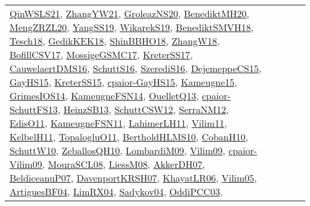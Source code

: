 {\begin{longtable}{llp{6cm}p{6cm}p{6cm}}
\href{articles/QinWSLS21.pdf}{QinWSLS21}\cite{QinWSLS21}, \href{articles/ZhangYW21.pdf}{ZhangYW21}\cite{ZhangYW21}, \href{papers/GroleazNS20.pdf}{GroleazNS20}\cite{GroleazNS20}, \href{articles/BenediktMH20.pdf}{BenediktMH20}\cite{BenediktMH20}, \href{articles/MengZRZL20.pdf}{MengZRZL20}\cite{MengZRZL20}, \href{papers/YangSS19.pdf}{YangSS19}\cite{YangSS19}, \href{articles/WikarekS19.pdf}{WikarekS19}\cite{WikarekS19}, \href{papers/BenediktSMVH18.pdf}{BenediktSMVH18}\cite{BenediktSMVH18}, \href{papers/Tesch18.pdf}{Tesch18}\cite{Tesch18}, \href{articles/GedikKEK18.pdf}{GedikKEK18}\cite{GedikKEK18}, \href{articles/ShinBBHO18.pdf}{ShinBBHO18}\cite{ShinBBHO18}, \href{articles/ZhangW18.pdf}{ZhangW18}\cite{ZhangW18}, \href{papers/BofillCSV17.pdf}{BofillCSV17}\cite{BofillCSV17}, \href{papers/MossigeGSMC17.pdf}{MossigeGSMC17}\cite{MossigeGSMC17}, \href{articles/KreterSS17.pdf}{KreterSS17}\cite{KreterSS17}, \href{papers/CauwelaertDMS16.pdf}{CauwelaertDMS16}\cite{CauwelaertDMS16}, \href{papers/SchuttS16.pdf}{SchuttS16}\cite{SchuttS16}, \href{papers/SzerediS16.pdf}{SzerediS16}\cite{SzerediS16}, \href{papers/DejemeppeCS15.pdf}{DejemeppeCS15}\cite{DejemeppeCS15}, \href{papers/GayHS15.pdf}{GayHS15}\cite{GayHS15}, \href{papers/KreterSS15.pdf}{KreterSS15}\cite{KreterSS15}, \href{papers/cpaior-GayHS15.pdf}{cpaior-GayHS15}\cite{cpaior-GayHS15}, \href{articles/Kameugne15.pdf}{Kameugne15}\cite{Kameugne15}, \href{articles/GrimesIOS14.pdf}{GrimesIOS14}\cite{GrimesIOS14}, \href{articles/KameugneFSN14.pdf}{KameugneFSN14}\cite{KameugneFSN14}, \href{papers/OuelletQ13.pdf}{OuelletQ13}\cite{OuelletQ13}, \href{papers/cpaior-SchuttFS13.pdf}{cpaior-SchuttFS13}\cite{cpaior-SchuttFS13}, \href{articles/HeinzSB13.pdf}{HeinzSB13}\cite{HeinzSB13}, \href{papers/SchuttCSW12.pdf}{SchuttCSW12}\cite{SchuttCSW12}, \href{papers/SerraNM12.pdf}{SerraNM12}\cite{SerraNM12}, \href{papers/EdisO11.pdf}{EdisO11}\cite{EdisO11}, \href{papers/KameugneFSN11.pdf}{KameugneFSN11}\cite{KameugneFSN11}, \href{papers/LahimerLH11.pdf}{LahimerLH11}\cite{LahimerLH11}, \href{papers/Vilim11.pdf}{Vilim11}\cite{Vilim11}, \href{articles/KelbelH11.pdf}{KelbelH11}\cite{KelbelH11}, \href{articles/TopalogluO11.pdf}{TopalogluO11}\cite{TopalogluO11}, \href{papers/BertholdHLMS10.pdf}{BertholdHLMS10}\cite{BertholdHLMS10}, \href{papers/CobanH10.pdf}{CobanH10}\cite{CobanH10}, \href{papers/SchuttW10.pdf}{SchuttW10}\cite{SchuttW10}, \href{articles/ZeballosQH10.pdf}{ZeballosQH10}\cite{ZeballosQH10}, \href{papers/LombardiM09.pdf}{LombardiM09}\cite{LombardiM09}, \href{papers/Vilim09.pdf}{Vilim09}\cite{Vilim09}, \href{papers/cpaior-Vilim09.pdf}{cpaior-Vilim09}\cite{cpaior-Vilim09}, \href{papers/MouraSCL08.pdf}{MouraSCL08}\cite{MouraSCL08}, \href{articles/LiessM08.pdf}{LiessM08}\cite{LiessM08}, \href{papers/AkkerDH07.pdf}{AkkerDH07}\cite{AkkerDH07}, \href{papers/BeldiceanuP07.pdf}{BeldiceanuP07}\cite{BeldiceanuP07}, \href{papers/DavenportKRSH07.pdf}{DavenportKRSH07}\cite{DavenportKRSH07}, \href{articles/KhayatLR06.pdf}{KhayatLR06}\cite{KhayatLR06}, \href{papers/Vilim05.pdf}{Vilim05}\cite{Vilim05}, \href{papers/ArtiguesBF04.pdf}{ArtiguesBF04}\cite{ArtiguesBF04}, \href{papers/LimRX04.pdf}{LimRX04}\cite{LimRX04}, \href{papers/Sadykov04.pdf}{Sadykov04}\cite{Sadykov04}, \href{papers/OddiPCC03.pdf}{OddiPCC03}\cite{OddiPCC03}, 
\end{longtable}}
